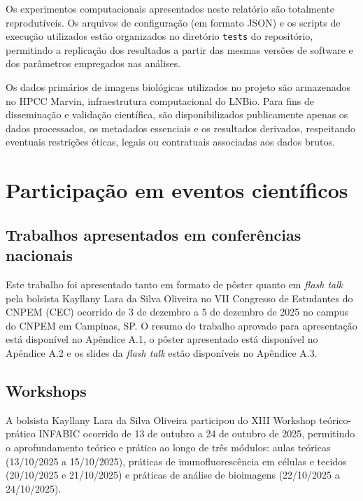 \documentclass[12pt]{article}
\begin{document}
Os experimentos computacionais apresentados neste relatório são totalmente reprodutíveis. Os arquivos de configuração (em formato JSON) e os scripts de execução utilizados estão organizados no diretório \texttt{tests} do repositório, permitindo a replicação dos resultados a partir das mesmas versões de software e dos parâmetros empregados nas análises.

Os dados primários de imagens biológicas utilizados no projeto são armazenados no HPCC Marvin, infraestrutura computacional do LNBio. Para fins de disseminação e validação científica, são disponibilizados publicamente apenas os dados processados, os metadados essenciais e os resultados derivados, respeitando eventuais restrições éticas, legais ou contratuais associadas aos dados brutos.

\clearpage

\section{Participação em eventos científicos}

\subsection{Trabalhos apresentados em conferências nacionais}

Este trabalho foi apresentado tanto em formato de pôster quanto em \textit{flash talk} pela bolsista Kayllany Lara da Silva Oliveira no VII Congresso de Estudantes do CNPEM (CEC) ocorrido de 3 de dezembro a 5 de dezembro de 2025 no campus do CNPEM em Campinas, SP. O resumo do trabalho aprovado para apresentação está disponível no Apêndice A.1, o pôster apresentado está disponível no Apêndice A.2 e os slides da \textit{flash talk} estão disponíveis no Apêndice A.3.

\subsection{Workshops}

A bolsista Kayllany Lara da Silva Oliveira participou do XIII Workshop teórico-prático INFABIC ocorrido de 13 de outubro a 24 de outubro de 2025, permitindo o aprofundamento teórico e prático ao longo de três módulos: aulas teóricas (13/10/2025 a 15/10/2025), práticas de imunofluorescência em células e tecidos (20/10/2025 e 21/10/2025) e práticas de análise de bioimagens (22/10/2025 a 24/10/2025).

\clearpage
{}


\end{document}
